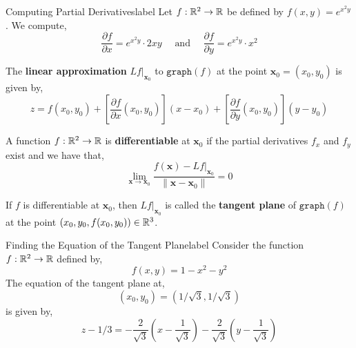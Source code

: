 \begin{ex}{Computing Partial Derivatives}{label}
Let $f: \mathbb{R}^2 \rightarrow \mathbb{R}$ be defined by $f(x, y) = e^{x^2 y}$. We compute,
\[\frac{\partial f}{\partial x} = e^{x^2 y} \cdot 2xy \quad \text{ and } \quad \frac{\partial f}{\partial y} = e^{x^2 y} \cdot x^2\]
\end{ex}

\begin{defn}
    \sloppy The \textbf{linear approximation} $L f |_{\mathbf{x}_0}$ to $\texttt{graph}(f)$ at the point $\mathbf{x}_0 = (x_0, y_0)$ is given by,
    \[
    z = f\left(x_0, y_0\right)+\left[\frac{\partial f}{\partial x}\left(x_0, y_0\right)\right]\left(x-x_0\right)+\left[\frac{\partial f}{\partial y}\left(x_0, y_0\right)\right]\left(y-y_0\right)
    \]
\end{defn}

\begin{defn}[Differentiability]
    A function $f: \mathbb{R}^2 \rightarrow \mathbb{R}$ is \textbf{differentiable} at $\mathbf{x}_0$ if the partial derivatives $f_x$ and $f_y$ exist and we have that,
    \[\lim_{\mathbf{x} \rightarrow \mathbf{x}_0} \frac{f(\mathbf{x}) - L f |_{\mathbf{x}_0}}{\|\mathbf{x} - \mathbf{x}_0\|} = 0\]
\end{defn}

\begin{cor}
    If $f$ is differentiable at $\mathbf{x}_0$, then $L f |_{\mathbf{x}_0}$ is called the \textbf{tangent plane} of $\texttt{graph}(f)$ at the point $(x_0, y_0, f(x_0, y_0)) \in \mathbb{R}^3$.
\end{cor}

\begin{ex}{Finding the Equation of the Tangent Plane}{label}
    Consider the function $f: \mathbb{R}^2 \rightarrow \mathbb{R}$ defined by,
    \[f(x, y)=1-x^2-y^2\]
    The equation of the tangent plane at,
    \[\left(x_0, y_0\right)=(1 / \sqrt{3}, 1 / \sqrt{3})\]
    is given by,
    \[z-1 / 3=-\frac{2}{\sqrt{3}}\left(x-\frac{1}{\sqrt{3}}\right)-\frac{2}{\sqrt{3}}\left(y-\frac{1}{\sqrt{3}}\right)\]
\end{ex}

